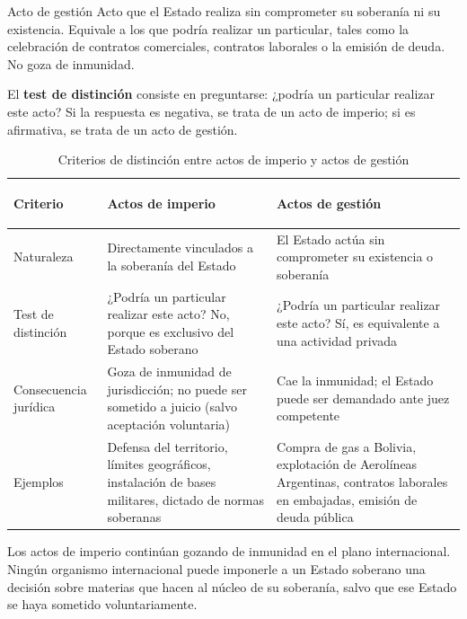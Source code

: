 \documentclass[12pt,oneside]{book}
\begin{document}
\begin{definition}{Acto de gestión}
Acto que el Estado realiza sin comprometer su soberanía ni su existencia. Equivale a los que podría realizar un particular, tales como la celebración de contratos comerciales, contratos laborales o la emisión de deuda. No goza de inmunidad.
\end{definition}

El \textbf{test de distinción} consiste en preguntarse: ¿podría un particular realizar este acto? Si la respuesta es negativa, se trata de un acto de imperio; si es afirmativa, se trata de un acto de gestión.

\begin{table}[H]
\centering
\caption{Criterios de distinción entre actos de imperio y actos de gestión}
\begin{tabularx}{\textwidth}{
    >{\bfseries\raggedright\arraybackslash}p{}
    >{\raggedright\arraybackslash}X
    >{\raggedright\arraybackslash}X
}
\toprule
\textbf{Criterio} & \textbf{Actos de imperio} & \textbf{Actos de gestión} \\
\midrule
Naturaleza & Directamente vinculados a la soberanía del Estado & El Estado actúa sin comprometer su existencia o soberanía \\
\addlinespace
Test de distinción & ¿Podría un particular realizar este acto? No, porque es exclusivo del Estado soberano & ¿Podría un particular realizar este acto? Sí, es equivalente a una actividad privada \\
\addlinespace
Consecuencia jurídica & Goza de inmunidad de jurisdicción; no puede ser sometido a juicio (salvo aceptación voluntaria) & Cae la inmunidad; el Estado puede ser demandado ante juez competente \\
\addlinespace
Ejemplos & Defensa del territorio, límites geográficos, instalación de bases militares, dictado de normas soberanas & Compra de gas a Bolivia, explotación de Aerolíneas Argentinas, contratos laborales en embajadas, emisión de deuda pública \\
\bottomrule
\end{tabularx}
\end{table}

\begin{important}
Los actos de imperio continúan gozando de inmunidad en el plano internacional. Ningún organismo internacional puede imponerle a un Estado soberano una decisión sobre materias que hacen al núcleo de su soberanía, salvo que ese Estado se haya sometido voluntariamente.
\end{important}
\end{document}
